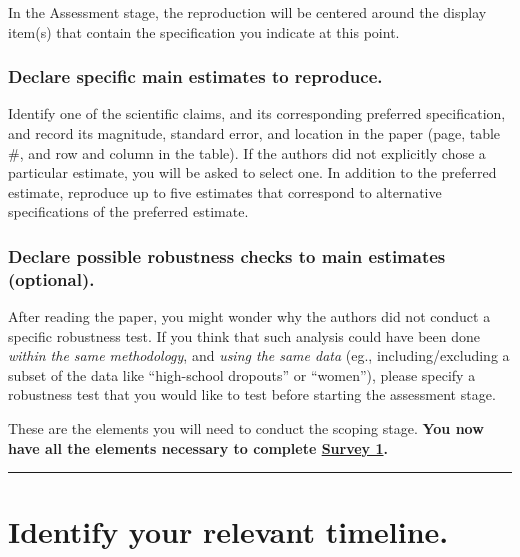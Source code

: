 \documentclass[]{book}
\begin{document}
In the Assessment stage, the reproduction will be centered around the display item(s) that contain the specification you indicate at this point.

\hypertarget{declare-specific-main-estimates-to-reproduce.}{%
\subsubsection*{Declare specific main estimates to reproduce.}\label{declare-specific-main-estimates-to-reproduce.}}

Identify one of the scientific claims, and its corresponding preferred specification, and record its magnitude, standard error, and location in the paper (page, table \#, and row and column in the table). If the authors did not explicitly chose a particular estimate, you will be asked to select one. In addition to the preferred estimate, reproduce up to five estimates that correspond to alternative specifications of the preferred estimate.

\hypertarget{declare-possible-robustness-checks-to-main-estimates-optional.}{%
\subsubsection*{Declare possible robustness checks to main estimates (optional).}\label{declare-possible-robustness-checks-to-main-estimates-optional.}}

After reading the paper, you might wonder why the authors did not conduct a specific robustness test. If you think that such analysis could have been done \emph{within the same methodology}, and \emph{using the same data} (eg., including/excluding a subset of the data like ``high-school dropouts'' or ``women''), please specify a robustness test that you would like to test before starting the assessment stage.

These are the elements you will need to conduct the scoping stage. \textbf{You now have all the elements necessary to complete \href{https://berkeley.qualtrics.com/jfe/form/SV_2bO83uJvU9ZiTXv}{Survey 1}.}

\begin{center}\rule{0.5\linewidth}{0.5pt}\end{center}

\hypertarget{identify-your-relevant-timeline.}{%
\section*{Identify your relevant timeline.}\label{identify-your-relevant-timeline.}}
\end{document}
